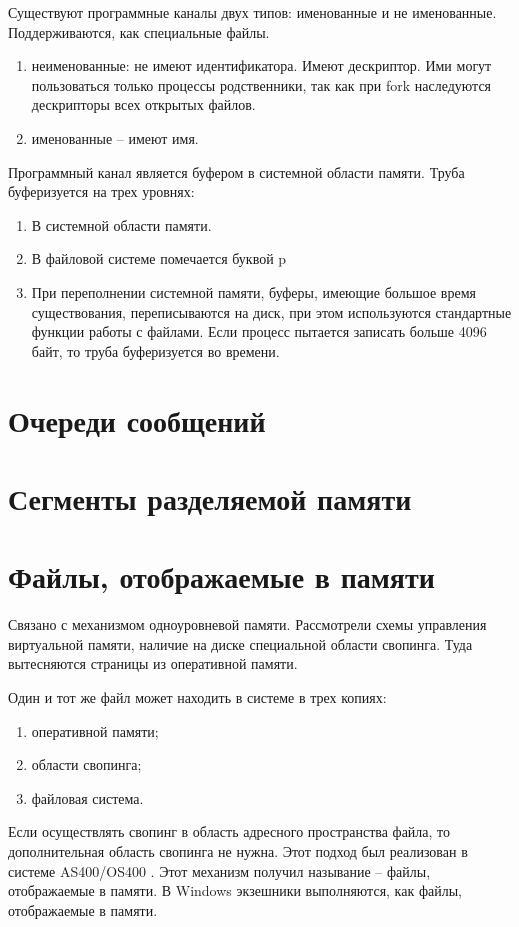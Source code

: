 Существуют программные каналы двух типов: именованные и не именованные. Поддерживаются, как специальные файлы.

\begin{enumerate}
    \item неименованные: не имеют идентификатора. Имеют дескриптор. Ими могут пользоваться только процессы родственники, так как при fork наследуются дескрипторы всех открытых файлов.
    \item именованные – имеют имя.
\end{enumerate} 

Программный канал является буфером в системной области памяти. Труба буферизуется на трех уровнях:
\begin{enumerate}
    \item В системной области памяти.
    \item В файловой системе помечается буквой p
    \item При переполнении системной памяти, буферы, имеющие большое время существования, переписываются на диск, при этом используются стандартные функции работы с файлами. Если процесс пытается записать больше 4096 байт, то труба буферизуется во времени.
\end{enumerate} 


\section{Очереди сообщений}

\section{Сегменты разделяемой памяти}

\section{Файлы, отображаемые в памяти}

Связано с механизмом одноуровневой памяти. Рассмотрели схемы управления виртуальной памяти, наличие на диске специальной области свопинга. Туда вытесняются страницы из оперативной памяти. 

Один и тот же файл может находить в системе в трех копиях:
\begin{enumerate}
    \item оперативной памяти;
	\item области свопинга;
	\item файловая система.
\end{enumerate} 

Если осуществлять свопинг в область адресного пространства файла, то дополнительная область свопинга не нужна. Этот подход был реализован в системе AS400/OS400 \cite{Soltis_AS400}. Этот механизм получил называние – файлы, отображаемые в памяти. В Windows экзешники выполняются, как файлы, отображаемые в памяти.